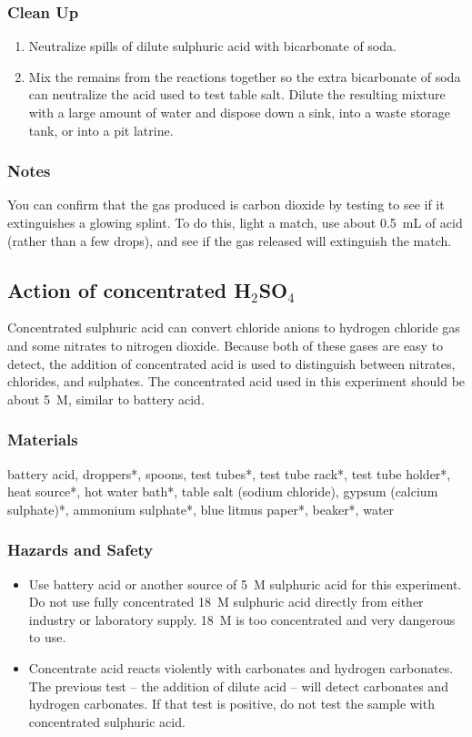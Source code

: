 \subsubsection{Clean Up}
\begin{enumerate}
\item{Neutralize spills of dilute sulphuric acid with bicarbonate of soda.}
\item{Mix the remains from the reactions together so the extra bicarbonate of soda can neutralize the acid used to test table salt. Dilute the resulting mixture with a large amount of water and dispose down a sink, into a waste storage tank, or into a pit latrine.}
\end{enumerate}

\subsubsection{Notes}
You can confirm that the gas produced is carbon dioxide by testing to see if it extinguishes a glowing splint. To do this, light a match, use about 0.5~mL of acid (rather than a few drops), and see if the gas released will extinguish the match.

\subsection{Action of concentrated H$_{2}$SO$_{4}$}

Concentrated sulphuric acid can convert chloride anions to hydrogen chloride gas and some nitrates to nitrogen dioxide. Because both of these gases are easy to detect, the addition of concentrated acid is used to distinguish between nitrates, chlorides, and sulphates. The concentrated acid used in this experiment should be about 5~M, similar to battery acid.

\subsubsection{Materials}
battery acid, droppers*, spoons, test tubes*, test tube rack*, test tube holder*, heat source*, hot water bath*, table salt (sodium chloride), gypsum (calcium sulphate)*, ammonium sulphate*, blue litmus paper*, beaker*, water

\subsubsection{Hazards and Safety}
\begin{itemize}
\item{Use battery acid or another source of 5~M sulphuric acid for this experiment. Do not use fully concentrated 18~M sulphuric acid directly from either industry or laboratory supply. 18~M is too concentrated and very dangerous to use.}
\item{Concentrate acid reacts violently with carbonates and hydrogen carbonates. The previous test -- the addition of dilute acid -- will detect carbonates and hydrogen carbonates. If that test is positive, do not test the sample with concentrated sulphuric acid.}
\end{itemize}

